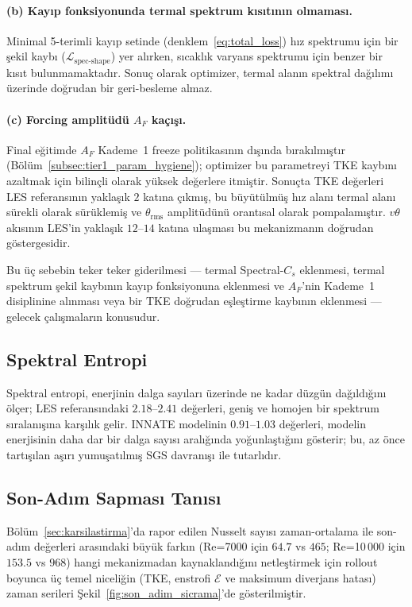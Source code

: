 \paragraph{(b) Kayıp fonksiyonunda termal spektrum kısıtının olmaması.} Minimal 5-terimli kayıp setinde (denklem~\eqref{eq:total_loss}) hız spektrumu için bir şekil kaybı ($\mathcal{L}_{\mathrm{spec\text{-}shape}}$) yer alırken, sıcaklık varyans spektrumu için benzer bir kısıt bulunmamaktadır. Sonuç olarak optimizer, termal alanın spektral dağılımı üzerinde doğrudan bir geri-besleme almaz.

\paragraph{(c) Forcing amplitüdü $A_{F}$ kaçışı.} Final eğitimde $A_{F}$ Kademe~1 freeze politikasının dışında bırakılmıştır (Bölüm~\ref{subsec:tier1_param_hygiene}); optimizer bu parametreyi TKE kaybını azaltmak için bilinçli olarak yüksek değerlere itmiştir. Sonuçta TKE değerleri LES referansının yaklaşık $2$ katına çıkmış, bu büyütülmüş hız alanı termal alanı sürekli olarak sürüklemiş ve $\theta_{\mathrm{rms}}$ amplitüdünü orantısal olarak pompalamıştır. $v\theta$ akısının LES'in yaklaşık $12$--$14$ katına ulaşması bu mekanizmanın doğrudan göstergesidir.

Bu üç sebebin teker teker giderilmesi --- termal Spectral-$C_{s}$ eklenmesi, termal spektrum şekil kaybının kayıp fonksiyonuna eklenmesi ve $A_{F}$'nin Kademe~1 disiplinine alınması veya bir TKE doğrudan eşleştirme kaybının eklenmesi --- gelecek çalışmaların konusudur.

\subsection{Spektral Entropi}

Spektral entropi, enerjinin dalga sayıları üzerinde ne kadar düzgün dağıldığını ölçer; LES referansındaki $2.18$--$2.41$ değerleri, geniş ve homojen bir spektrum sıralanışına karşılık gelir. INNATE modelinin $0.91$--$1.03$ değerleri, modelin enerjisinin daha dar bir dalga sayısı aralığında yoğunlaştığını gösterir; bu, az önce tartışılan aşırı yumuşatılmış SGS davranışı ile tutarlıdır.

\subsection{Son-Adım Sapması Tanısı}
\label{sec:son_adim_sicrama}

Bölüm~\ref{sec:karsilastirma}'da rapor edilen Nusselt sayısı zaman-ortalama ile son-adım değerleri arasındaki büyük farkın (Re=7000 için $64.7$ vs $465$; Re=10\,000 için $153.5$ vs $968$) hangi mekanizmadan kaynaklandığını netleştirmek için rollout boyunca üç temel niceliğin (TKE, enstrofi $\mathcal{E}$ ve maksimum diverjans hatası) zaman serileri Şekil~\ref{fig:son_adim_sicrama}'de gösterilmiştir.

